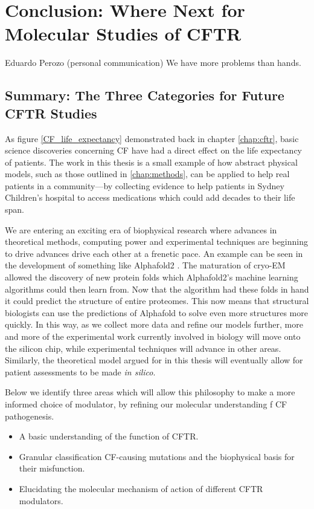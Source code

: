 \chapter{Conclusion: Where Next for Molecular Studies of CFTR}
\label{chap:conclusion}
\begin{chapquote} {Eduardo Perozo (personal communication)}
We have more problems than hands. 
\end{chapquote}


\section{Summary: The Three Categories for Future CFTR Studies}

As figure \ref{CF_life_expectancy} demonstrated back in chapter \ref{chap:cftr}, basic science discoveries concerning CF have had a direct effect on the life expectancy of patients. The work in this thesis is a small example of how abstract physical models, such as those outlined in \ref{chap:methods}, can be applied to help real patients in a community---by collecting evidence to help patients in Sydney Children's hospital to access medications which could add decades to their life span. 

We are entering an exciting era of biophysical research where advances in theoretical methods, computing power and experimental techniques are beginning to drive advances drive each other at a frenetic pace. An example can be seen in the development of something like Alphafold2 \cite{jumper2021}. The maturation of cryo-EM allowed the discovery of new protein folds which Alphafold2's machine learning algorithms could then learn from. Now that the algorithm had these folds in hand it could predict the structure of entire proteomes. This now means that structural biologists can use the predictions of Alphafold to solve even more structures more quickly. In this way, as we collect more data and refine our models further, more and more of the experimental work currently involved in biology will move onto the silicon chip, while experimental techniques will advance in other areas. Similarly, the theoretical model argued for in this thesis will eventually allow for patient assessments to be made \textit{in silico}.

Below we identify three areas which will allow this philosophy to make a more informed choice of modulator, by refining our molecular understanding f CF pathogenesis.

\begin{itemize}
	\item A basic understanding of the function of CFTR.
	\item Granular classification CF-causing mutations and the biophysical basis for their misfunction.
	\item Elucidating the molecular mechanism of action of different CFTR modulators. 
\end{itemize}

